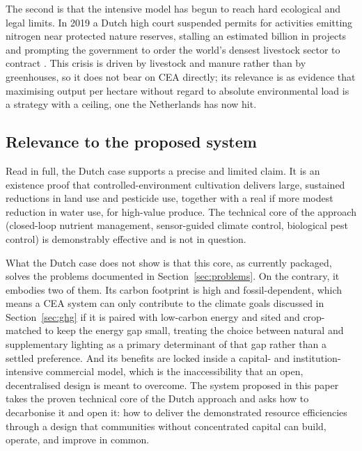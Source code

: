 The second is that the intensive model has begun to reach hard ecological and legal limits. In 2019 a Dutch high court suspended permits for activities emitting nitrogen near protected nature reserves, stalling an estimated  billion in projects and prompting the government to order the world's densest livestock sector to contract \cite[p.~1180]{stokstad2019nitrogen}. This crisis is driven by livestock and manure rather than by greenhouses, so it does not bear on CEA directly; its relevance is as evidence that maximising output per hectare without regard to absolute environmental load is a strategy with a ceiling, one the Netherlands has now hit.

\subsection{Relevance to the proposed system}

Read in full, the Dutch case supports a precise and limited claim. It is an existence proof that controlled-environment cultivation delivers large, sustained reductions in land use and pesticide use, together with a real if more modest reduction in water use, for high-value produce. The technical core of the approach (closed-loop nutrient management, sensor-guided climate control, biological pest control) is demonstrably effective and is not in question.

What the Dutch case does not show is that this core, as currently packaged, solves the problems documented in Section~\ref{sec:problems}. On the contrary, it embodies two of them. Its carbon footprint is high and fossil-dependent, which means a CEA system can only contribute to the climate goals discussed in Section~\ref{sec:ghg} if it is paired with low-carbon energy and sited and crop-matched to keep the energy gap small, treating the choice between natural and supplementary lighting as a primary determinant of that gap rather than a settled preference. And its benefits are locked inside a capital- and institution-intensive commercial model, which is the inaccessibility that an open, decentralised design is meant to overcome. The system proposed in this paper takes the proven technical core of the Dutch approach and asks how to decarbonise it and open it: how to deliver the demonstrated resource efficiencies through a design that communities without concentrated capital can build, operate, and improve in common.
